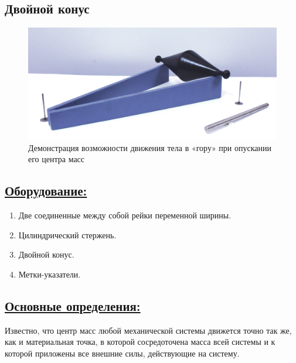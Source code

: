 \documentclass[14pt,a4paper,oneside]{extarticle}	%
\begin{document}
	

	\begin{center}
		\subsection*{Двойной конус}
	\end{center}
	
	\begin{figure}[H] 
		\centering 
		\includegraphics[width=0.9\linewidth]{center-3.png}
		\caption{Демонстрация возможности движения тела в «гору» при опускании его центра масс}
		\label{center-3}
	\end{figure}
	
	\subsection*{\underline{Оборудование:}}
	
	\begin{enumerate} 
		\item Две соединенные между собой рейки переменной ширины.
		\item Цилиндрический стержень.
		\item Двойной конус.
		\item Метки-указатели.
	\end{enumerate}

	\newpage
	\subsection*{\underline{Основные определения:}}
	
	Известно, что центр масс любой механической системы движется точно так же, как и материальная точка, в которой сосредоточена масса всей системы и к которой приложены все внешние силы, действующие на систему.
	
\end{document}
